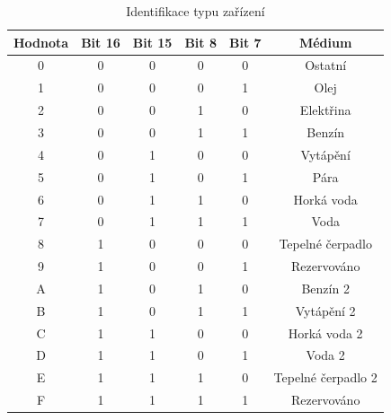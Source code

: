 			\begin{table}[!ht]
			\centering
			\vspace{-10pt}
			\caption{Identifikace typu zařízení}
			\label{def_device_type_identification}
			\begin{tabular}{|c|c|c|c|c|c|}
			\hline
			\textbf{Hodnota} & \textbf{Bit 16}   & \textbf{Bit 15}   & \textbf{Bit 8}   & \textbf{Bit 7}  & \textbf{Médium  }                      \\ \hline\hline
			0           & 0        & 0        & 0       & 0      & Ostatní                   \\ \hline
			1           & 0        & 0        & 0       & 1      & Olej                     \\ \hline
			2           & 0        & 0        & 1       & 0      & Elektřina             \\ \hline
			3           & 0        & 0        & 1       & 1      & Benzín                     \\ \hline
			4           & 0        & 1        & 0       & 0      & Vytápění                    \\ \hline
			5           & 0        & 1        & 0       & 1      & Pára                   \\ \hline
			6           & 0        & 1        & 1       & 0      & Horká voda               \\ \hline
			7           & 0        & 1        & 1       & 1      & Voda                   \\ \hline
			8           & 1        & 0        & 0       & 0      & Tepelné čerpadlo                \\ \hline
			9           & 1        & 0        & 0       & 1      & Rezervováno                \\ \hline
			A           & 1        & 0        & 1       & 0      & Benzín 2              \\ \hline
			B           & 1        & 0        & 1       & 1      & Vytápění 2             \\ \hline
			C           & 1        & 1        & 0       & 0      & Horká voda 2        \\ \hline
			D           & 1        & 1        & 0       & 1      & Voda 2            \\ \hline
			E           & 1        & 1        & 1       & 0      & Tepelné čerpadlo 2           \\ \hline
			F           & 1        & 1        & 1       & 1      & Rezervováno                 \\ \hline\hline
			\end{tabular}
			\vspace{-5pt}
			\end{table}


